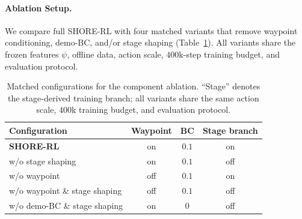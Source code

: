\documentclass[letterpaper]{article} %
\begin{document}
\paragraph{Ablation Setup.}
We compare full SHORE-RL with four matched variants that remove waypoint
conditioning, demo-BC, and/or stage shaping (Table~\ref{tab:ablarms}).
All variants share the frozen features $\psi$, offline data, action scale,
$400$k-step training budget, and evaluation protocol.

\begin{table}[t]
\centering\small\setlength{\tabcolsep}{2pt}
\begin{tabular}{@{}>{\raggedright\arraybackslash}m{}ccc@{}}
\toprule
Configuration & Waypoint & BC & Stage branch \\
\midrule
\textbf{SHORE-RL}                       & on  & $0.1$ & on  \\
\addlinespace[1pt]
w/o stage shaping                       & on  & $0.1$ & off \\
\addlinespace[1pt]
w/o waypoint                            & off & $0.1$ & on  \\
\addlinespace[1pt]
w/o waypoint \& stage shaping           & off & $0.1$ & off \\
\addlinespace[1pt]
w/o demo-BC \& stage shaping            & on  & $0$   & off \\
\bottomrule
\end{tabular}
\caption{Matched configurations for the component ablation. ``Stage'' denotes
the stage-derived training branch; all variants share the same action scale,
$400$k training budget, and evaluation protocol.}
\label{tab:ablarms}
\end{table}
\end{document}
